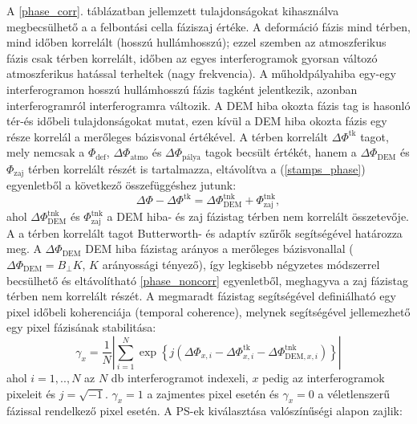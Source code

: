 \documentclass[12pt]{report}
\numberwithin{equation}{section}
\numberwithin{table}{section}
\numberwithin{figure}{section}
\begin{document}
A \ref{phase_corr}. táblázatban jellemzett tulajdonságokat kihasználva megbecsülhető a a felbontási cella fáziszaj értéke. A deformáció fázis mind térben, mind időben korrelált (hosszú hullámhosszú); ezzel szemben az atmoszferikus fázis csak térben korrelált, időben az egyes interferogramok gyorsan változó atmoszferikus hatással terheltek (nagy frekvencia). A műholdpályahiba egy-egy interferogramon hosszú hullámhosszú fázis tagként jelentkezik, azonban interferogramról interferogramra változik. A DEM hiba okozta fázis tag is hasonló tér-és időbeli tulajdonságokat mutat, ezen kívül a DEM hiba okozta fázis egy része korrelál a merőleges bázisvonal értékével. A térben korrelált $\Delta\Phi^{\text{tk}}$ tagot, mely nemcsak a $\Phi_{\text{def}}$, $\Delta\Phi_{\text{atmo}}$ és $\Delta\Phi_{\text{pálya}}$ tagok becsült értékét, hanem a $\Delta\Phi_{\text{DEM}}$ és $\Phi_{\text{zaj}}$ térben korrelált részét is tartalmazza, eltávolítva a (\ref{stamps_phase}) egyenletből a következő összefüggéshez jutunk:
\begin{equation}\label{phase_noncorr}
    \Delta\Phi - \Delta\Phi^{\text{tk}} = \Delta\Phi_{\text{DEM}}^{\text{tnk}} + \Phi_{\text{zaj}}^{\text{tnk}},
\end{equation}
ahol $\Delta\Phi_{\text{DEM}}^{\text{tnk}}$ és $\Phi_{\text{zaj}}^{\text{tnk}}$ a DEM hiba- és zaj fázistag térben nem korrelált összetevője. A \stamps a térben korrelált tagot Butterworth- és adaptív szűrők segítségével határozza meg. A $\Delta\Phi_{\text{DEM}}$ DEM hiba fázistag arányos a merőleges bázisvonallal ($\Delta\Phi_{\text{DEM}} = B_{\perp} K$, $K$ arányossági tényező), így legkisebb négyzetes módszerrel becsülhető és eltávolítható \ref{phase_noncorr} egyenletből, meghagyva a zaj fázistag térben nem korrelált részét. A megmaradt fázistag segítségével definiálható egy pixel időbeli koherenciája (temporal coherence), melynek segítségével jellemezhető egy pixel fázisának stabilitása:
\begin{equation}\label{temp_coh}
    \gamma_x = \frac{1}{N} \left| \sum_{i=1}^{N} \exp \left\{ j \left(\Delta\Phi_{x,i} - \Delta\Phi_{x,i}^{\text{tk}} - \Delta\Phi_{\text{DEM}, x,i}^{\text{tnk}} \right) \right\} \right|
\end{equation}
ahol $i = 1,..,N$ az $N$ db interferogramot indexeli, $x$ pedig az interferogramok pixeleit és $j = \sqrt{-1}$. $\gamma_x = 1$ a zajmentes pixel esetén és $\gamma_x = 0$ a véletlenszerű fázissal rendelkező pixel esetén. A PS-ek kiválasztása valószínűségi alapon zajlik:
\end{document}
